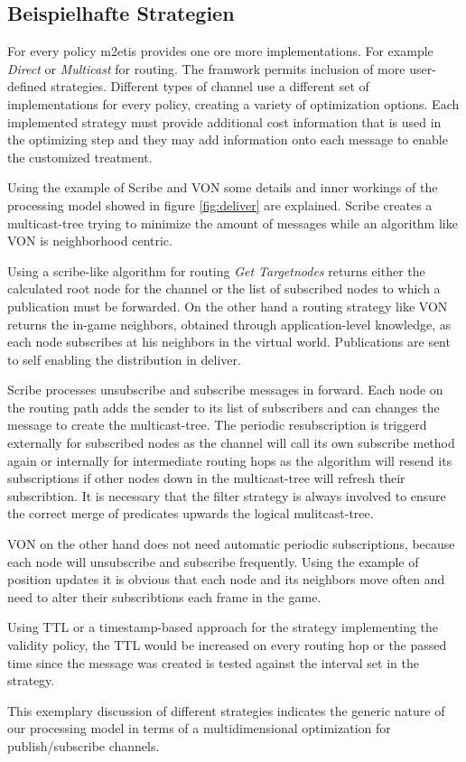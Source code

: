 \subsection{Beispielhafte Strategien}
For every policy \ac{m2etis} provides one ore more implementations. For example \emph{Direct} or \emph{Multicast} for routing. The framwork permits inclusion of more user-defined strategies. Different types of channel use a different set of implementations for every policy, creating a variety of optimization options. Each implemented strategy must provide additional cost information that is used in the optimizing step and they may add information onto each message to enable the customized treatment.

Using the example of Scribe \cite{Castro2002Scribe} and VON \cite{Hu2006VON} some details and inner workings of the processing model showed in figure \ref{fig:deliver} are explained. Scribe creates a multicast-tree trying to minimize the amount of messages while an algorithm like VON is neighborhood centric.

Using a scribe-like algorithm for routing \emph{Get Targetnodes} returns either the calculated root node for the channel or the list of subscribed nodes to which a publication must be forwarded. On the other hand a routing strategy like VON returns the in-game neighbors, obtained through application-level knowledge, as each node subscribes at his neighbors in the virtual world. Publications are sent to self enabling the distribution in deliver.

Scribe processes unsubscribe and subscribe messages in forward. Each node on the routing path adds the sender to its list of subscribers and can changes the message to create the multicast-tree. The periodic resubscription is triggerd externally for subscribed nodes as the channel will call its own subscribe method again or internally for intermediate routing hops as the algorithm will resend its subscriptions if other nodes down in the multicast-tree will refresh their subscribtion. It is necessary that the filter strategy is always involved to ensure the correct merge of predicates upwards the logical mulitcast-tree.

VON on the other hand does not need automatic periodic subscriptions, because each node will unsubscribe and subscribe frequently. Using the example of position updates it is obvious that each node and its neighbors move often and need to alter their subscribtions each frame in the game.

Using TTL or a timestamp-based approach for the strategy implementing the validity policy, the TTL would be increased on every routing hop or the passed time since the message was created is tested against the interval set in the strategy.

This exemplary discussion of different strategies indicates the generic nature of our processing model in terms of a multidimensional optimization for publish/subscribe channels.
